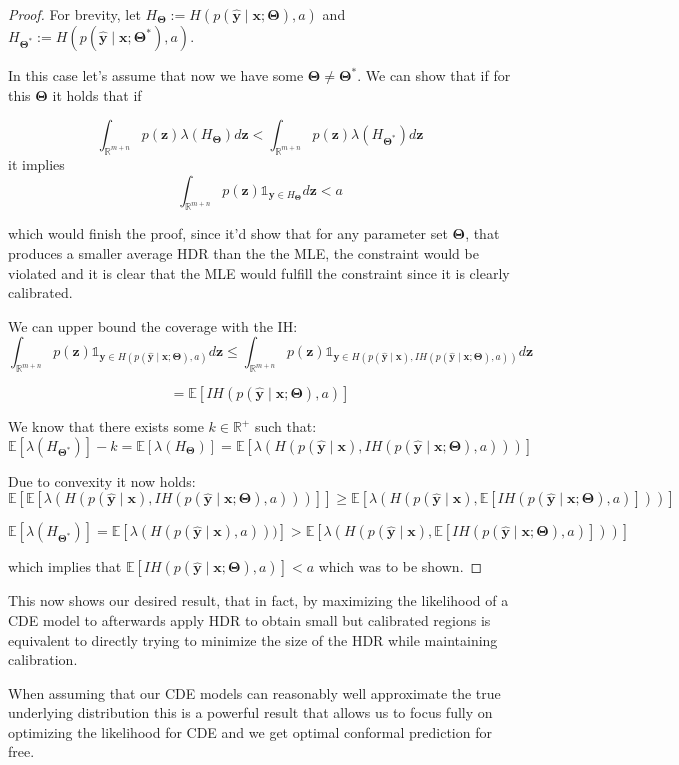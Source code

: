\documentclass{article}
\theoremstyle{definition}
\begin{document}
\begin{proof}
For brevity, let $H_{\mathbf{\Theta}} := H(p(\mathbf{\hat{y}}\mid \mathbf{x}; \mathbf{\Theta}), a)$ and  $H_{\mathbf{\Theta^*}} := H(p(\mathbf{\hat{y}}\mid \mathbf{x}; \mathbf{\Theta}^*), a)$.

In this case let's assume that now we have some $\mathbf{\Theta} \neq \mathbf{\Theta}^*$. We can show that if for this $\mathbf{\Theta}$ it holds that if 

$$\int_{\mathbb{R}^{m + n}} p(\mathbf{z}) \lambda(H_{\mathbf{\Theta}}) d\mathbf{z} < \int_{\mathbb{R}^{m + n}} p(\mathbf{z}) \lambda(H_{\mathbf{\Theta^*}}) d\mathbf{z}$$
it implies
$$\int_{\mathbb{R}^{m + n}} p(\mathbf{z}) \mathds{1}_{\mathbf{y} \in H_{\mathbf{\Theta}}} d \mathbf{z} < a$$

which would finish the proof, since it'd show that for any parameter set $\mathbf{\Theta}$, that produces a smaller average HDR than the the MLE, the constraint would be violated and it is clear that the MLE would fulfill the constraint since it is clearly calibrated.

We can upper bound the coverage with the IH:
$$\int_{\mathbb{R}^{m + n}} p(\mathbf{z}) \mathds{1}_{\mathbf{y} \in H(p(\mathbf{\hat{y}} \mid \mathbf{x}; \mathbf{\Theta}), a)} d\mathbf{z} 
\leq \int_{\mathbb{R}^{m + n}} p(\mathbf{z}) \mathds{1}_{\mathbf{y} \in H(p(\mathbf{\hat{y}} \mid \mathbf{x}), IH(p(\mathbf{\hat{y}}\mid \mathbf{x}; \mathbf{\Theta}), a))} d\mathbf{z}$$

$$= \mathbb{E}\left[IH(p(\mathbf{\hat{y}}\mid \mathbf{x}; \mathbf{\Theta}), a) \right]$$

We know that there exists some $k\in\mathbb{R}^+$ such that:
$$\mathbb{E}\left[\lambda(H_{\mathbf{\Theta^*}})\right] - k
=\mathbb{E}\left[ \lambda(H_{\mathbf{\Theta}}) \right]
=\mathbb{E}\left[ \lambda(H(p(\mathbf{\hat{y}}\mid\mathbf{x}), IH(p(\mathbf{\hat{y}}\mid \mathbf{x}; \mathbf{\Theta}), a))) \right]$$

Due to convexity it now holds:
$$\mathbb{E}\left[\mathbb{E}\left[ \lambda(H(p(\mathbf{\hat{y}}\mid\mathbf{x}), IH(p(\mathbf{\hat{y}}\mid \mathbf{x}; \mathbf{\Theta}), a))) \right]\right] 
\geq \mathbb{E}\left[ \lambda(H(p(\mathbf{\hat{y}}\mid\mathbf{x}), \mathbb{E}\left[IH(p(\mathbf{\hat{y}}\mid \mathbf{x}; \mathbf{\Theta}), a) \right] ))\right]$$

$$\mathbb{E}\left[\lambda(H_{\mathbf{\Theta^*}})\right]
= \mathbb{E}\left[\lambda(H(p(\mathbf{\hat{y}}\mid \mathbf{x}),a)))\right]
> \mathbb{E}\left[ \lambda(H(p(\mathbf{\hat{y}}\mid\mathbf{x}), \mathbb{E}\left[IH(p(\mathbf{\hat{y}}\mid \mathbf{x}; \mathbf{\Theta}), a) \right] ))\right]$$

which implies that $\mathbb{E}\left[IH(p(\mathbf{\hat{y}}\mid \mathbf{x}; \mathbf{\Theta}), a) \right] < a$ which was to be shown.

\end{proof}
This now shows our desired result, that in fact, by maximizing the likelihood of a CDE model to afterwards apply HDR to obtain small but calibrated regions is equivalent to directly trying to minimize the size of the HDR while maintaining calibration.

When assuming that our CDE models can reasonably well approximate the true underlying distribution this is a powerful result that allows us to focus fully on optimizing the likelihood for CDE and we get optimal conformal prediction for free.


\end{document}
